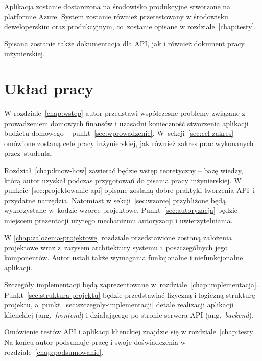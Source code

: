 Aplikacja zostanie dostarczona na środowisko produkcyjne stworzone na platformie Azure. System zostanie również przetestowany w środowisku deweloperskim oraz produkcyjnym, co~zostanie opisane w rozdziale~\ref{chap:testy}.

Spisana zostanie także dokumentacja dla API, jak i również dokument pracy inżynierskiej.

\section{Układ pracy}
\label{sec:uklad-pracy}
W rozdziale~\ref{chap:wstep} autor przedstawi współczesne problemy związane z prowadzeniem domowych finansów i uzasadni konieczność stworzenia aplikacji budżetu domowego -- punkt~\ref{sec:wprowadzenie}. W~sekcji~\ref{sec:cel-zakres} omówione zostaną cele pracy inżynierskiej, jak również zakres prac wykonanych  przez~studenta.

Rozdział~\ref{chap:know-how} zawierać będzie wstęp teoretyczny -- bazę wiedzy, którą autor uzyskał podczas przygotowań do pisania pracy inżynierskiej. W punkcie~\ref{sec:projektowanie-api} opisane zostaną dobre praktyki tworzenia API~i przydatne narzędzia. Natomiast w sekcji~\ref{sec:wzorce} przybliżone będą wykorzystane w~kodzie wzorce projektowe. Punkt~\ref{sec:autoryzacja} będzie miejscem prezentacji użytego mechanizmu autoryzacji i uwierzytelniania.

W \ref{chap:zalozenia-projektowe} rozdziale przedstawione zostaną założenia projektowe wraz z~zarysem architektury systemu i~poszczególnych jego komponentów. Autor ustali także wymagania funkcjonalne i niefunkcjonalne aplikacji.

Szczegóły implementacji będą zaprezentowane w~rozdziale~\ref{chap:implementacja}. Punkt~\ref{sec:struktura-projektu} będzie przedstawiać fizyczną i logiczną strukturę projektu, a~punkt~\ref{sec:szczegoly-implementacji} detale realizacji aplikacji klienckiej (ang.~\emph{frontend}) i działającego po stronie serwera API (ang.~\emph{backend}).

Omówienie testów API i aplikacji klienckiej znajdzie się w rozdziale~\ref{chap:testy}. Na końcu autor podsumuje pracę i swoje doświadczenia w rozdziale~\ref{chap:podsumowanie}.